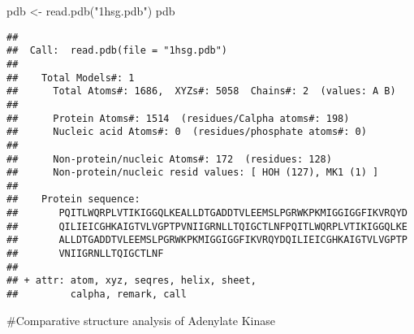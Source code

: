 \documentclass[
]{article}
\newenvironment{Shaded}{\begin{snugshade}}{\end{snugshade}}
\newcommand{\FunctionTok}[1]{\textcolor[rgb]{0.00,0.00,0.00}{#1}}
\newcommand{\NormalTok}[1]{#1}
\newcommand{\OtherTok}[1]{\textcolor[rgb]{0.56,0.35,0.01}{#1}}
\newcommand{\StringTok}[1]{\textcolor[rgb]{0.31,0.60,0.02}{#1}}
\begin{document}
\begin{Shaded}
\begin{Highlighting}[]
\NormalTok{pdb }\OtherTok{\textless{}{-}} \FunctionTok{read.pdb}\NormalTok{(}\StringTok{"1hsg.pdb"}\NormalTok{)}
\NormalTok{pdb}
\end{Highlighting}
\end{Shaded}

\begin{verbatim}
## 
##  Call:  read.pdb(file = "1hsg.pdb")
## 
##    Total Models#: 1
##      Total Atoms#: 1686,  XYZs#: 5058  Chains#: 2  (values: A B)
## 
##      Protein Atoms#: 1514  (residues/Calpha atoms#: 198)
##      Nucleic acid Atoms#: 0  (residues/phosphate atoms#: 0)
## 
##      Non-protein/nucleic Atoms#: 172  (residues: 128)
##      Non-protein/nucleic resid values: [ HOH (127), MK1 (1) ]
## 
##    Protein sequence:
##       PQITLWQRPLVTIKIGGQLKEALLDTGADDTVLEEMSLPGRWKPKMIGGIGGFIKVRQYD
##       QILIEICGHKAIGTVLVGPTPVNIIGRNLLTQIGCTLNFPQITLWQRPLVTIKIGGQLKE
##       ALLDTGADDTVLEEMSLPGRWKPKMIGGIGGFIKVRQYDQILIEICGHKAIGTVLVGPTP
##       VNIIGRNLLTQIGCTLNF
## 
## + attr: atom, xyz, seqres, helix, sheet,
##         calpha, remark, call
\end{verbatim}

\#Comparative structure analysis of Adenylate Kinase
\end{document}

